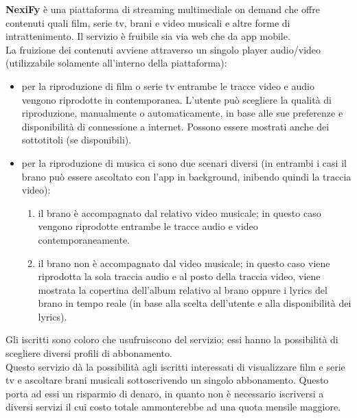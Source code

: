 \textbf{NexiFy} è una piattaforma di streaming multimediale on demand che offre contenuti quali film, serie tv, brani e video musicali e altre forme di intrattenimento. Il servizio è fruibile sia via web che da app mobile.\\

La fruizione dei contenuti avviene attraverso un singolo player audio/video (utilizzabile solamente all'interno della piattaforma):
\begin{itemize}\item per la riproduzione di film o serie tv entrambe le tracce video e audio vengono riprodotte in contemporanea. L’utente può scegliere la qualità di riproduzione, manualmente o automaticamente, in base alle sue preferenze e disponibilità di connessione a internet. Possono essere mostrati anche dei sottotitoli (se disponibili).
    \item per la riproduzione di musica ci sono due scenari diversi (in entrambi i casi il brano può essere ascoltato con l’app in background, inibendo quindi la traccia video):
    \begin{enumerate}
        \item il brano è accompagnato dal relativo video musicale; in questo caso vengono riprodotte entrambe le tracce audio e video contemporaneamente.
        \item il brano non è accompagnato dal video musicale; in questo caso viene riprodotta la sola traccia audio e al posto della traccia video, viene mostrata la copertina dell’album relativo al brano oppure i lyrics del brano in tempo reale (in base alla scelta dell’utente e alla disponibilità dei lyrics).
    \end{enumerate}
\end{itemize}

Gli iscritti sono coloro che usufruiscono del servizio; essi hanno la possibilità di scegliere diversi profili di abbonamento.\\

Questo servizio dà la possibilità agli iscritti interessati di visualizzare film e serie tv e ascoltare brani musicali sottoscrivendo un singolo abbonamento. Questo porta ad essi un risparmio di denaro, in quanto non è necessario iscriversi a diversi servizi il cui costo totale ammonterebbe ad una quota mensile maggiore.
